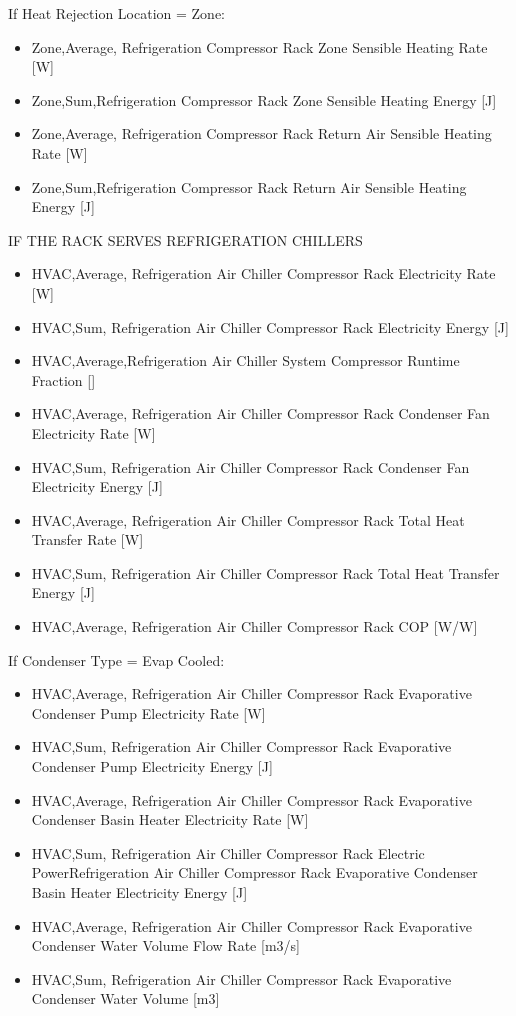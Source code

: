 If Heat Rejection Location = Zone:

\begin{itemize}
\item
  Zone,Average, Refrigeration Compressor Rack Zone Sensible Heating Rate {[}W{]}
\item
  Zone,Sum,Refrigeration Compressor Rack Zone Sensible Heating Energy {[}J{]}
\item
  Zone,Average, Refrigeration Compressor Rack Return Air Sensible Heating Rate {[}W{]}
\item
  Zone,Sum,Refrigeration Compressor Rack Return Air Sensible Heating Energy {[}J{]}
\end{itemize}

IF THE RACK SERVES REFRIGERATION CHILLERS

\begin{itemize}
\item
  HVAC,Average, Refrigeration Air Chiller Compressor Rack Electricity Rate {[}W{]}
\item
  HVAC,Sum, Refrigeration Air Chiller Compressor Rack Electricity Energy {[}J{]}
\item
  HVAC,Average,Refrigeration Air Chiller System Compressor Runtime Fraction {[]}
\item
  HVAC,Average, Refrigeration Air Chiller Compressor Rack Condenser Fan Electricity Rate {[}W{]}
\item
  HVAC,Sum, Refrigeration Air Chiller Compressor Rack Condenser Fan Electricity Energy {[}J{]}
\item
  HVAC,Average, Refrigeration Air Chiller Compressor Rack Total Heat Transfer Rate {[}W{]}
\item
  HVAC,Sum, Refrigeration Air Chiller Compressor Rack Total Heat Transfer Energy {[}J{]}
\item
  HVAC,Average, Refrigeration Air Chiller Compressor Rack COP {[}W/W{]}
\end{itemize}

If Condenser Type = Evap Cooled:

\begin{itemize}
\item
  HVAC,Average, Refrigeration Air Chiller Compressor Rack Evaporative Condenser Pump Electricity Rate {[}W{]}
\item
  HVAC,Sum, Refrigeration Air Chiller Compressor Rack Evaporative Condenser Pump Electricity Energy {[}J{]}
\item
  HVAC,Average, Refrigeration Air Chiller Compressor Rack Evaporative Condenser Basin Heater Electricity Rate {[}W{]}
\item
  HVAC,Sum, Refrigeration Air Chiller Compressor Rack Electric PowerRefrigeration Air Chiller Compressor Rack Evaporative Condenser Basin Heater Electricity Energy {[}J{]}
\item
  HVAC,Average, Refrigeration Air Chiller Compressor Rack Evaporative Condenser Water Volume Flow Rate {[}m3/s{]}
\item
  HVAC,Sum, Refrigeration Air Chiller Compressor Rack Evaporative Condenser Water Volume {[}m3{]}
\end{itemize}

